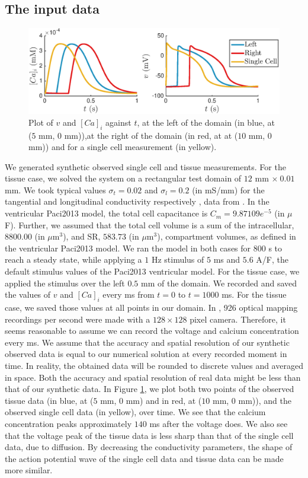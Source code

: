 \documentclass{article}
\begin{document}
\subsection{The input data} \label{The input data}
%
\begin{figure}
   \includegraphics[width=1\linewidth]{strip} 
    \caption{Plot of $v$ and $[Ca]_i$ against $t$, at the left of the domain (in blue, at ($5$ mm, $0$ mm)),at the right of the domain (in red, at at ($10$ mm, $0$ mm)) and for a single cell measurement (in yellow).}
    \label{fig:3}
\end{figure}
%
We generated synthetic observed single cell and tissue measurements. For the tissue case, we solved the system on a rectangular test domain of $12$ mm $\times\: 0.01$ mm. We took typical values $\sigma_t=0.02$ and $\sigma_l=0.2$ (in mS/mm) for the tangential and longitudinal conductivity respectively \cite{Roth}, data from \cite{Plonsey1982, Plonsey1984}. In the ventricular Paci2013 model, the total cell capacitance is $C_m=9.87109e^{-5}$ (in $\mu$F). Further, we assumed that the total cell volume is a sum of the intracellular, $8800.00$ (in $\mu$m$^3$), and SR, $583.73$ (in $\mu$m$^3$), compartment volumes, as defined in the ventricular Paci2013 model.
We ran the model in both cases for 800 s to reach a steady state, while applying a $1$ Hz stimulus of $5$ ms and $5.6$ A/F, the default stimulus values of the Paci2013 ventricular model. For the tissue case, we applied the stimulus over the left $0.5$ mm of the domain. We recorded and saved the values of $v$ and $[Ca]_i$ every ms from $t=0$ to $t=1000$ ms. For the tissue case, we saved those values at all points in our domain. In \cite{Lee2012}, 926 optical mapping recordings per second were made with a $128 \times 128$ pixel camera. Therefore, it seems reasonable to assume we can record the voltage and calcium concentration every ms. We assume that the accuracy and spatial resolution of our synthetic observed data is equal to our numerical solution at every recorded moment in time. In reality, the obtained data will be rounded to discrete values and averaged in space. Both the accuracy and spatial resolution of real data might be less than that of our synthetic data. In Figure \ref{fig:3}, we plot both two points of the observed tissue data (in blue, at ($5$ mm, $0$ mm) and in red, at ($10$ mm, $0$ mm)), and the observed single cell data (in yellow), over time. We see that the calcium concentration peaks approximately $140$ ms after the voltage does. We also see that the voltage peak of the tissue data is less sharp than that of the single cell data, due to diffusion. By decreasing the conductivity parameters, the shape of the action potential wave of the single cell data and tissue data can be made more similar.
%
\end{document}
